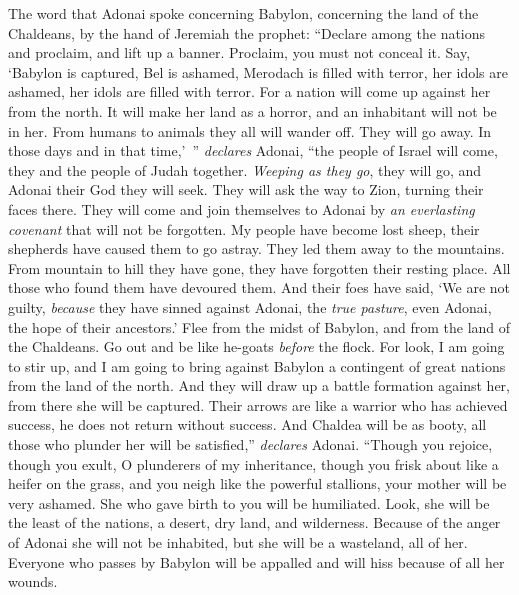 \begin{biblechapter} %
 The word that Adonai spoke concerning Babylon, concerning the land of the Chaldeans, by the hand of Jeremiah the prophet:
\verse “Declare among the nations and proclaim, 
and lift up a banner. 
Proclaim, you must not conceal it. 
Say, ‘Babylon is captured, 
Bel is ashamed, 
Merodach is filled with terror, 
her idols are ashamed, 
her idols are filled with terror.
\verse For a nation will come up against her from the north. 
It will make her land as a horror, 
and an inhabitant will not be in her. 
From humans to animals they all will wander off. 
They will go away.
\verse In those days and in that time,’ ” \textit{declares} Adonai, 
“the people of Israel will come, 
they and the people of Judah together. 
\textit{Weeping as they go}, they will go, 
and Adonai their God they will seek.
\verse They will ask the way to Zion, 
turning their faces there. 
They will come and join themselves to Adonai 
by \textit{an everlasting covenant} that will not be forgotten.
\verse My people have become lost sheep, 
their shepherds have caused them to go astray. 
They led them away to the mountains. 
From mountain to hill they have gone, 
they have forgotten their resting place.
\verse All those who found them have devoured them. 
And their foes have said, ‘We are not guilty, 
\textit{because} they have sinned against Adonai, the \textit{true pasture}, 
even Adonai, the hope of their ancestors.’
\verse Flee from the midst of Babylon, 
and from the land of the Chaldeans. 
Go out and be like he-goats 
\textit{before} the flock.
\verse For look, I am going to stir up, 
and I am going to bring against Babylon 
a contingent of great nations 
from the land of the north. 
And they will draw up a battle formation against her, 
from there she will be captured. 
Their arrows are like a warrior who has achieved success, 
he does not return without success.
\verse And Chaldea will be as booty, 
all those who plunder her will be satisfied,” \textit{declares} Adonai.
\verse “Though you rejoice, though you exult, 
O plunderers of my inheritance, 
though you frisk about like a heifer on the grass, 
and you neigh like the powerful stallions,
\verse your mother will be very ashamed. 
She who gave birth to you will be humiliated. 
Look, she will be the least of the nations, 
a desert, dry land, and wilderness.
\verse Because of the anger of Adonai she will not be inhabited, 
but she will be a wasteland, all of her. 
Everyone who passes by Babylon will be appalled 
and will hiss because of all her wounds.

\end{biblechapter}
